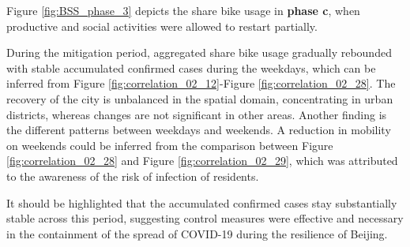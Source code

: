 \documentclass[ijgi,submit,moreauthors,pdftex]{Definitions/mdpi}
\begin{document}
Figure \ref{fig:BSS_phase_3} depicts the share bike usage in \textbf{phase c}, when productive and social activities were allowed to restart partially.

During the mitigation period, aggregated share bike usage gradually rebounded with stable accumulated confirmed cases during the weekdays, which can be inferred from Figure \ref{fig:correlation_02_12}-Figure \ref{fig:correlation_02_28}.
The recovery of the city is unbalanced in the spatial domain, concentrating in urban districts, whereas changes are not significant in other areas.
Another finding is the different patterns between weekdays and weekends.
A reduction in mobility on weekends could be inferred from the comparison between Figure \ref{fig:correlation_02_28} and Figure \ref{fig:correlation_02_29}, which was attributed to the awareness of the risk of infection of residents.

It should be highlighted that the accumulated confirmed cases stay substantially stable across this period, suggesting control measures were effective and necessary in the containment of the spread of COVID-19 during the resilience of Beijing.
\end{document}
